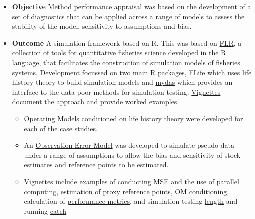 \documentclass[a4paper, 10pt]{article}
\newcommand{\coilin}{\textcolor{coilin}}
\begin{document}
\begin{itemize}[labelindent=\parindent,noitemsep,topsep=0pt,parsep=0pt,partopsep=0pt]
 \item \textbf{Objective} Method performance appraisal was based on the development of a set of diagnostics that can be applied across a range of models to assess the stability of the model, sensitivity to assumptions and bias.
 
 \item \textbf{Outcome} A simulation framework based on R. This was based on \href{http://www.flr-project.org/}{FLR}, a collection of tools for quantitative fisheries science developed in the R language, that facilitates the construction of simulation models of fisheries systems. Development focussed on two main R packages, \href{https://github.com/flr/flife}{FLife} which uses life history theory to build simulation models and 
    \href{https://github.com/flr/mydas/wiki}{mydas} which provides an interface to the data poor methods for simulation testing. \href{https://3o2y9wugzp1kfxr5hvzgzq-on.drv.tw/MyDas/mydas_vignettes.html}{Vignettes} document the approach and provide worked examples. 
    \begin{itemize}
   \item Operating Models conditioned on life history theory were developed for each of the 
    \href{https://3o2y9wugzp1kfxr5hvzgzq-on.drv.tw/MyDas/om.html}{case studies}.
    \item An \href{https://3o2y9wugzp1kfxr5hvzgzq-on.drv.tw/MyDas/vignettes/oemod.html}{Observation Error Model} was developed to simulate pseudo data under a range of assumptions to allow the bias and sensitivity of stock estimates and reference points to be estimated.    
    \item Vignettes include examples of conducting \href{https://3o2y9wugzp1kfxr5hvzgzq-on.drv.tw/MyDas/vignettes/mse.html}{MSE} and the use of \href{https://3o2y9wugzp1kfxr5hvzgzq-on.drv.tw/MyDas/vignettes/parallel.html}{parallel computing}, estimation of
    \href{https://3o2y9wugzp1kfxr5hvzgzq-on.drv.tw/MyDas/vignettes/proxies.html}{proxy reference points},  \href{https://3o2y9wugzp1kfxr5hvzgzq-on.drv.tw/MyDas/vignettes/turbot.html}{OM conditioning}, calculation of \href{https://3o2y9wugzp1kfxr5hvzgzq-on.drv.tw/MyDas/vignettes/performance.html}{performance metrics}, and simulation testing \href{https://3o2y9wugzp1kfxr5hvzgzq-on.drv.tw/MyDas/vignettes/length.html}{length} and running    \href{https://3o2y9wugzp1kfxr5hvzgzq-on.drv.tw/MyDas/vignettes/sra.html}{catch} %
    \end{itemize}
\end{itemize}
\end{document}
